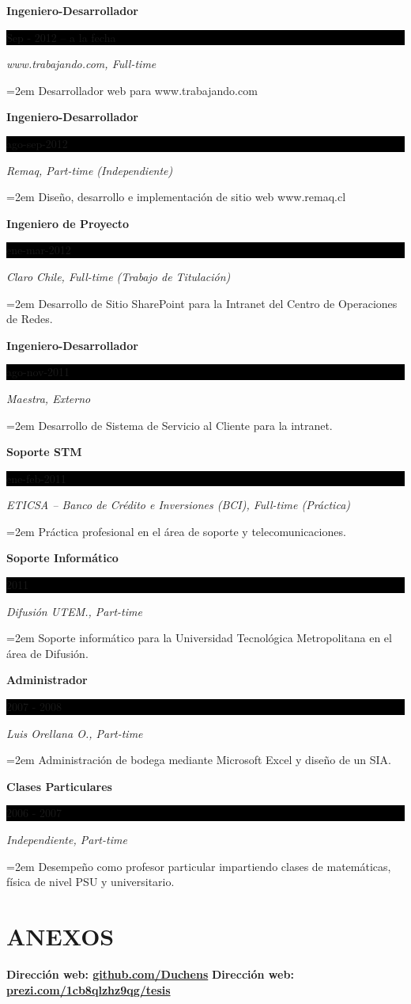 \documentclass[paper=a4,fontsize=11pt]{scrartcl}	 			%
\newcommand{\sepspace}{\vspace*{1em}}			%
\newcommand{\NewPart}[1]{\section*{\uppercase{#1}}}
\newcommand{\EducationEntry}[4]{
		\noindent \textbf{#1} \hfill 					%
		\colorbox{Black}{%
			\parbox{6em}{%
			\hfill\color{White}#2}} \par				%
		\noindent \textit{#3} \par					%
		\noindent\hangindent=2em\hangafter=0 \small #4 	%
		\normalsize \par}
\begin{document}
\EducationEntry{Ingeniero-Desarrollador}{Sep - 2012 -- a la fecha}{www.trabajando.com,  Full-time}{Desarrollador web para  www.trabajando.com}
\sepspace
\EducationEntry{Ingeniero-Desarrollador}{ago-sep-2012}{Remaq,  Part-time (Independiente)}{Diseño, desarrollo e implementación de sitio web www.remaq.cl}
\sepspace
\EducationEntry{Ingeniero de Proyecto}{ene-mar-2012}{Claro Chile,  Full-time (Trabajo de Titulación)}{Desarrollo de Sitio SharePoint para la Intranet del Centro de Operaciones de Redes.}
\sepspace
\EducationEntry{Ingeniero-Desarrollador}{ago-nov-2011}{Maestra, Externo}{Desarrollo de Sistema de Servicio al Cliente para la intranet.}
\sepspace
\EducationEntry{Soporte STM}{ene-feb-2011}{ETICSA – Banco de Crédito e Inversiones (BCI), Full-time (Práctica)}{Práctica profesional en el área de soporte y telecomunicaciones.}
\sepspace
\EducationEntry{Soporte Informático}{2011}{Difusión UTEM., Part-time}{Soporte informático para la Universidad Tecnológica Metropolitana en el área de Difusión.}
\sepspace
\EducationEntry{Administrador}{2007 - 2008}{Luis Orellana O., Part-time}{Administración de bodega mediante Microsoft Excel y diseño de un SIA.}
\sepspace
\EducationEntry{Clases Particulares}{2006 - 2007}{Independiente, Part-time}{Desempeño como profesor particular impartiendo  clases de matemáticas, física de nivel PSU y universitario. }
\NewPart{Anexos}{}
\textbf{Dirección web: \hspace{0.6cm}   \url{github.com/Duchens}}
\sepspace
\textbf{Dirección web:  \hspace{0.6cm}  \url{prezi.com/1cb8qlzhz9qg/tesis}}
\end{document}
